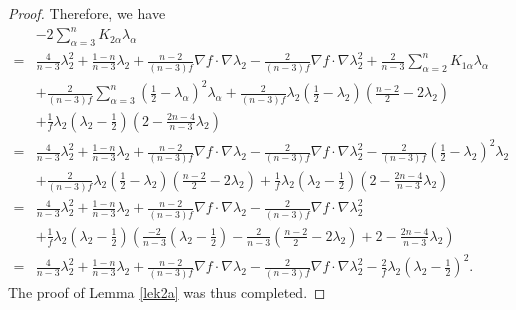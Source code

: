 \documentclass[10pt,a4paper]{amsart}
\begin{document}
\begin{proof}
Therefore, we have
\begin{equation*}
	\begin{aligned}
		&-2\sum_{\alpha=3}^nK_{2\alpha}\lambda_\alpha\\
	=&\frac{4}{n-3}\lambda_2^2+\frac{1-n}{n-3}\lambda_2+\frac{n-2}{(n-3)f}\nabla f\cdot \nabla \lambda_2-\frac{2}{(n-3)f}\nabla f\cdot \nabla \lambda_2^2+\frac{2}{n-3}\sum_{\alpha=2}^nK_{1\alpha}\lambda_\alpha\\
		&+\frac{2}{(n-3)f}\sum_{\alpha=3}^n({\frac{1}{2}}-\lambda_{\alpha})^2\lambda_{\alpha}	 +\frac{2}{(n-3)f}\lambda_2(\frac{1}{2}-\lambda_2)({\frac{n-2}{2}}-2\lambda_{2})\\
		&+\frac{1}{f}\lambda_2(\lambda_2-\frac{1}{2})(2-\frac{2n-4}{n-3}\lambda_2)\\
=&\frac{4}{n-3}\lambda_2^2+\frac{1-n}{n-3}\lambda_2+\frac{n-2}{(n-3)f}\nabla f\cdot \nabla \lambda_2-\frac{2}{(n-3)f}\nabla f\cdot \nabla \lambda_2^2-\frac{2}{(n-3)f}({\frac{1}{2}}-\lambda_2)^2\lambda_2\\
 &+	\frac{2}{(n-3)f}\lambda_2(\frac{1}{2}-\lambda_2)({\frac{n-2}{2}}-2\lambda_{2})
		+\frac{1}{f}\lambda_2(\lambda_2-\frac{1}{2})(2-\frac{2n-4}{n-3}\lambda_2)\\
=&\frac{4}{n-3}\lambda_2^2+\frac{1-n}{n-3}\lambda_2+\frac{n-2}{(n-3)f}\nabla f\cdot \nabla \lambda_2-\frac{2}{(n-3)f}\nabla f\cdot \nabla \lambda_2^2\\
&+\frac{1}{f}\lambda_2(\lambda_2-\frac{1}{2})\left( \frac{-2}{n-3}(\lambda_2-\frac{1}{2})-\frac{2}{n-3}(\frac{n-2}{2}-2\lambda_2)+2-\frac{2n-4}{n-3}\lambda_2\right)\\
=&\frac{4}{n-3}\lambda_2^2+\frac{1-n}{n-3}\lambda_2+\frac{n-2}{(n-3)f}\nabla f\cdot \nabla \lambda_2-\frac{2}{(n-3)f}\nabla f\cdot \nabla \lambda_2^2-\frac{2}{f}\lambda_2(\lambda_2-\frac{1}{2})^2.
	\end{aligned}
\end{equation*}
The proof of Lemma \ref{lek2a} was thus completed.
\end{proof}
\end{document}
